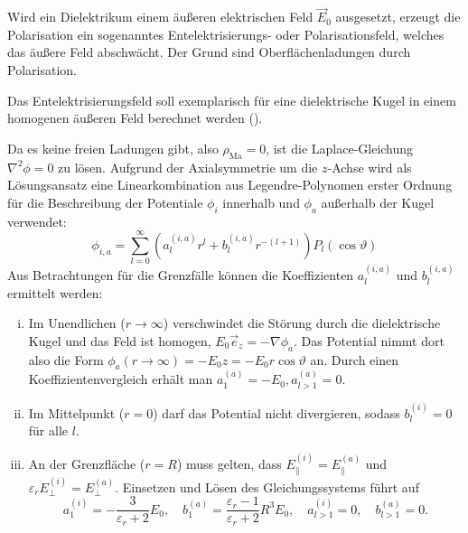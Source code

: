 Wird ein Dielektrikum einem äußeren elektrischen Feld $\vec {E}_{0}$ ausgesetzt, erzeugt die Polarisation ein sogenanntes Entelektrisierungs- oder Polarisationsfeld, welches das äußere Feld abschwächt. Der Grund sind Oberflächenladungen durch Polarisation.

Das Entelektrisierungsfeld soll exemplarisch für eine dielektrische Kugel in einem homogenen äußeren Feld berechnet werden ().

Da es keine freien Ladungen gibt, also $\rho _{\mathrm{Ma}}=0$, ist die Laplace-Gleichung $\nabla ^{2}\phi =0$ zu lösen. Aufgrund der Axialsymmetrie um die $z$-Achse wird als Lösungsansatz eine Linearkombination aus Legendre-Polynomen erster Ordnung für die Beschreibung der Potentiale $\phi _{i}$ innerhalb und $\phi _{a}$ außerhalb der Kugel verwendet:
\begin{equation*}
	\phi _{i,a}=\sum _{l=0}^{\infty }\left(a_{l}^{\left(i,a\right)}r^{l}+b_{l}^{\left(i,a\right)}r^{-\left(l+1\right)}\right)P_{l}\left(\cos \vartheta \right)
\end{equation*}
Aus Betrachtungen für die Grenzfälle können die Koeffizienten $a_{l}^{\left(i,a\right)}$ und $b_{l}^{\left(i,a\right)}$ ermittelt werden:

\begin{enumerate}[i)]
	\item Im Unendlichen ($r\rightarrow \infty $) verschwindet die Störung durch die dielektrische Kugel und das Feld ist homogen, $E_{0}\vec {e}_{z}=-\nabla \phi _{a}$. Das Potential nimmt dort also die Form $\phi _{a}\left(r\rightarrow \infty \right)=-E_{0}z=-E_{0}r\cos \vartheta $ an. Durch einen Koeffizientenvergleich erhält man $a_{1}^{\left(a\right)}=-E_{0}, a_{l>1}^{\left(a\right)}=0$.

	\item Im Mittelpunkt ($r=0$) darf das Potential nicht divergieren, sodass $b_{l}^{\left(i\right)}=0$ für alle $l$.

	\item An der Grenzfläche ($r=R$) muss gelten, dass $E_{\parallel }^{\left(i\right)}=E_{\parallel }^{\left(a\right)}$ und $\varepsilon _{r}E_{\perp }^{\left(i\right)}=E_{\perp }^{\left(a\right)}$. Einsetzen und Lösen des Gleichungssystems führt auf
		\begin{equation*}
			a_{1}^{\left(i\right)}=-\frac{3}{\varepsilon _{r}+2}E_{0},\quad b_{1}^{\left(a\right)}=\frac{\varepsilon _{r}-1}{\varepsilon _{r}+2}R^{3}E_{0},\quad a_{l>1}^{\left(i\right)}=0,\quad b_{l>1}^{\left(a\right)}=0.
		\end{equation*}
\end{enumerate}

